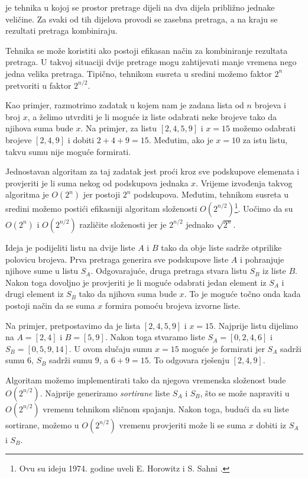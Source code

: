 
 je tehnika
u kojoj se prostor pretrage dijeli na
dva dijela približno jednake veličine.
Za svaki od tih dijelova
provodi se zasebna pretraga,
a na kraju se rezultati pretraga kombiniraju.

Tehnika se može koristiti
ako postoji efikasan način za kombiniranje
rezultata pretraga.
U takvoj situaciji dvije pretrage mogu zahtijevati manje
vremena nego jedna velika pretraga.
Tipično, tehnikom susreta u sredini možemo
faktor $2^n$ pretvoriti
u faktor $2^{n/2}$.

Kao primjer, razmotrimo zadatak u kojem
nam je zadana lista od $n$ brojeva i
broj $x$,
a želimo utvrditi je li moguće
iz liste odabrati neke brojeve tako da
njihova suma bude $x$.
Na primjer, za listu $[2,4,5,9]$ i $x=15$
možemo odabrati brojeve $[2,4,9]$ i dobiti $2+4+9=15$.
Međutim, ako je $x=10$ za istu listu,
takvu sumu nije moguće formirati.

Jednostavan algoritam za taj zadatak jest
proći kroz sve podskupove elemenata i
provjeriti je li suma nekog od podskupova jednaka $x$.
Vrijeme izvođenja takvog algoritma je $O(2^n)$
jer postoji $2^n$ podskupova.
Međutim, tehnikom susreta u sredini
možemo postići efikasniji algoritam složenosti $O(2^{n/2})$\footnote{Ovu
su ideju 1974. godine uveli E. Horowitz i S. Sahni \cite{hor74}.}.
Uočimo da su $O(2^n)$ i $O(2^{n/2})$ različite
složenosti jer je $2^{n/2}$ jednako $\sqrt{2^n}$.

Ideja je podijeliti listu na
dvije liste $A$ i $B$ tako da obje
liste sadrže otprilike polovicu brojeva.
Prva pretraga generira sve podskupove
liste $A$ i pohranjuje njihove sume u listu $S_A$.
Odgovarajuće, druga pretraga stvara
listu $S_B$ iz liste $B$.
Nakon toga dovoljno je provjeriti je li moguće
odabrati jedan element iz $S_A$ i drugi
element iz $S_B$ tako da njihova suma bude $x$.
To je moguće točno onda kada postoji način da se
suma $x$ formira pomoću brojeva izvorne liste.

Na primjer, pretpostavimo da je lista $[2,4,5,9]$ i $x=15$.
Najprije listu dijelimo na $A=[2,4]$ i $B=[5,9]$.
Nakon toga stvaramo liste
$S_A=[0,2,4,6]$ i $S_B=[0,5,9,14]$.
U ovom slučaju sumu $x=15$ moguće je formirati
jer $S_A$ sadrži sumu $6$,
$S_B$ sadrži sumu $9$, a $6+9=15$.
To odgovara rješenju $[2,4,9]$.

Algoritam možemo implementirati tako da
njegova vremenska složenost bude $O(2^{n/2})$.
Najprije generiramo \emph{sortirane} liste $S_A$ i $S_B$,
što se može napraviti u $O(2^{n/2})$ vremenu tehnikom sličnom spajanju.
Nakon toga, budući da su liste sortirane,
možemo u $O(2^{n/2})$ vremenu provjeriti može li se
suma $x$ dobiti iz $S_A$ i $S_B$.